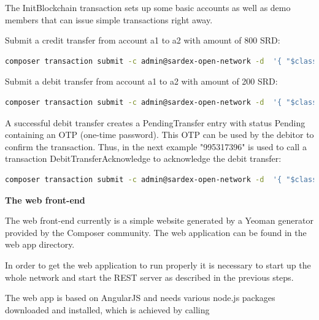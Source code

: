 The InitBlockchain transaction sets up some basic accounts as well as demo members that can issue simple transactions right away.

Submit a credit transfer from account a1 to a2 with amount of 800 SRD:

\begin{lstlisting}[language=bash]
	composer transaction submit -c admin@sardex-open-network -d  '{ "$class": "net.sardex.interlace.CreditTransfer", "amount": 800, "fromAccount": "resource:net.sardex.interlace.CCAccount#a1", "toAccount": "resource:net.sardex.interlace.CCAccount#a2" }'
\end{lstlisting}

Submit a debit transfer from account a1 to a2 with amount of 200 SRD:

\begin{lstlisting}[language=bash]
	composer transaction submit -c admin@sardex-open-network -d  '{ "$class": "net.sardex.interlace.DebitTransfer", "amount": 200, "fromAccount": "resource:net.sardex.interlace.CCAccount#a1", "toAccount": "resource:net.sardex.interlace.CCAccount#a2" }'
\end{lstlisting}

A successful debit transfer creates a PendingTransfer entry with status Pending containing an OTP (one-time password). This OTP can be used by the debitor to confirm the transaction. Thus, in the next example "995317396" is used to call a transaction DebitTransferAcknowledge to acknowledge the debit transfer:

\begin{lstlisting}[language=bash]
	composer transaction submit -c admin@sardex-open-network -d  '{ "$class": "net.sardex.interlace.DebitTransferAcknowledge", "transfer": "resource:net.sardex.interlace.PendingTransfer#995317396" }'
\end{lstlisting}

\textbf{The web front-end}

The web front-end currently is a simple website generated by a Yeoman generator provided by the Composer community. The web application can be found in the web app directory.

In order to get the web application to run properly it is necessary to start up the whole network and start the REST server as described in the previous steps.

The web app is based on AngularJS and needs various node.js packages downloaded and installed, which is achieved by calling

